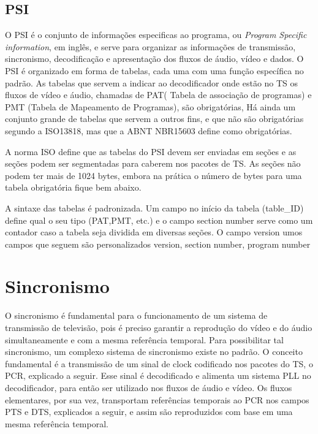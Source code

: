 \documentclass[
	12pt,				%
	openright,			%
	twoside,			%
	a4paper,			%
	english,			%
	french,				%
	brazil				%
	]{abntex2}
\begin{document}

\subsection{PSI}

O PSI é o conjunto de informações especificas ao programa, ou \textit{Program Specific information}, em inglês,
e serve para organizar as informações de transmissão, sincronismo, decodificação e apresentação dos
fluxos de áudio, vídeo e dados. O PSI é organizado em forma de tabelas, cada uma com uma função específica no
padrão. As tabelas que servem a indicar ao decodificador onde estão no TS os fluxos de vídeo e áudio, chamadas
de PAT( Tabela de associação de programas) e PMT (Tabela de Mapeamento de Programas), são obrigatórias,
Há ainda um conjunto grande de tabelas que servem a outros fins, e que não são obrigatórias segundo a ISO13818,
mas que a ABNT NBR15603 define como obrigatórias.

A norma ISO define que as tabelas do PSI devem ser enviadas em seções e as seções podem ser segmentadas para
caberem nos pacotes de TS. As seções não podem ter mais de 1024 bytes, embora na prática o número de bytes 
para uma tabela obrigatória fique bem abaixo.

A sintaxe das tabelas é padronizada. Um campo no início da tabela (table\_ID) define qual o seu tipo
(PAT,PMT, etc.) e o campo section number serve como um contador caso a tabela seja dividida em diversas
seções. O campo version umos campos que seguem são personalizados version, section number, program number 

\section{Sincronismo}

O sincronismo é fundamental para o funcionamento de um sistema de transmissão de televisão, pois é
preciso garantir a reprodução do vídeo e do áudio simultaneamente e com a mesma referência temporal.
Para possibilitar tal sincronismo, um complexo sistema de sincronismo existe no padrão. O conceito
fundamental é a transmissão de um sinal de clock codificado nos pacotes do TS, o PCR, explicado a seguir.
Esse sinal é decodificado
e alimenta um sistema PLL no decodificador, para então ser utilizado nos fluxos de áudio e vídeo.
Os fluxos elementares, por sua vez, transportam referências temporais ao PCR nos campos PTS e DTS, explicados
a seguir, e assim são reproduzidos com base em uma mesma referência temporal.
\end{document}

